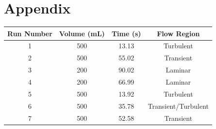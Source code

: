 \documentclass{article}
\begin{document}
\section{Appendix}
\begin{center}
    \begin{tabular}{|c|c|c|c|} 
        \hline
        \textbf{Run Number} & \textbf{Volume (mL)} & \textbf{Time (s)} & \textbf{Flow Region}  \\ 
        \hline
        1                   & 500                  & 13.13             & Turbulent             \\ 
        \hline
        2                   & 500                  & 55.02             & Transient             \\ 
        \hline
        3                   & 200                  & 90.02             & Laminar               \\ 
        \hline
        4                   & 200                  & 66.99             & Laminar               \\ 
        \hline
        5                   & 500                  & 13.92             & Turbulent             \\ 
        \hline
        6                   & 500                  & 35.78             & Transient/Turbulent   \\ 
        \hline
        7                   & 500                  & 52.58             & Transient             \\
        \hline
    \end{tabular}
\end{center}
\end{document}
